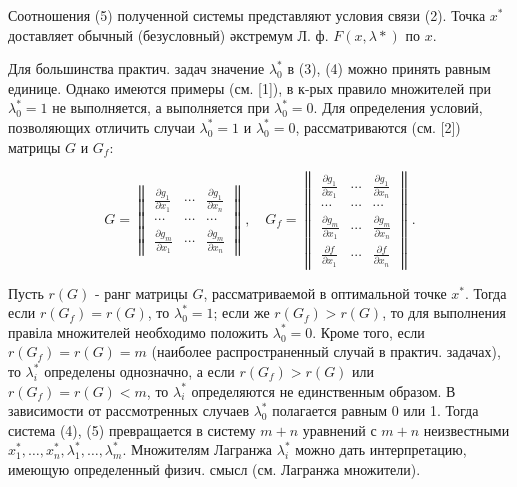 \documentclass[10pt]{article}
\begin{document}
Соотношения (5) полученной системы представляют условия связи (2). Точка $x^{*}$ доставляет обычный (безусловный) әкстремум Л. ф. $F(x, \lambda *)$ по $x$.



Для большинства практич. задач значение $\lambda_{0}^{*}$ в (3), (4) можно принять равным единице. Однако имеются примеры (см. [1]), в к-рых правило множителей при $\lambda_{0}^{*}=1$ не выполняется, а выполняется при $\lambda_{0}^{*}=0$. Для определения условий, позволяющих отличить случаи $\lambda_{0}^{*}=1$ и $\lambda_{0}^{*}=0$, рассматриваются (см. [2]) матрицы $G$ и $G_{f}:$



\[

G=\left\|\begin{array}{ccc}

\frac{\partial g_{1}}{\partial x_{1}} & \cdots & \frac{\partial g_{1}}{\partial x_{n}} \\

\cdots & \cdots & \cdots \\

\frac{\partial g_{m}}{\partial x_{1}} & \cdots & \frac{\partial g_{m}}{\partial x_{n}}

\end{array}\right\|, \quad G_{f}=\left\|\begin{array}{ccc}

\frac{\partial g_{1}}{\partial x_{1}} & \cdots & \frac{\partial g_{1}}{\partial x_{n}} \\

\cdots & \cdots & \cdots \\

\frac{\partial g_{m}}{\partial x_{1}} & \cdots & \frac{\partial g_{m}}{\partial x_{n}} \\

\frac{\partial f}{\partial x_{1}} & \cdots & \frac{\partial f}{\partial x_{n}}

\end{array}\right\| .

\]



Пусть $r(G)$ - ранг матрицы $G$, рассматриваемой в оптимальной точке $x^{*}$. Тогда если $r\left(G_{f}\right)=r(G)$, то $\lambda_{0}^{*}=1$; если же $r\left(G_{f}\right)>r(G)$, то для выполнения правіла множителей необходимо положить $\lambda_{0}^{*}=0$. Кроме того, если $r\left(G_{f}\right)=r(G)=m$ (наиболее распространенный случай в практич. задачах), то $\lambda_{i}^{*}$ определены однозначно, а если $r\left(G_{f}\right)>r(G)$ или $r\left(G_{f}\right)=r(G)<m$, то $\lambda_{i}^{*}$ определяются не единственным образом. В зависимости от рассмотренных случаев $\lambda_{0}^{*}$ полагается равным 0 или 1. Тогда система (4), (5) превращается в систему $m+n$ уравнений с $m+n$ неизвестными $x_{1}^{*}, \ldots, x_{n}^{*}, \lambda_{1}^{*}, \ldots, \lambda_{m}^{*}$. Множителям Лагранжа $\lambda_{i}^{*}$ можно дать интерпретацию, имеющую определенный физич. смысл (см. Лагранжа множители).
\end{document}

